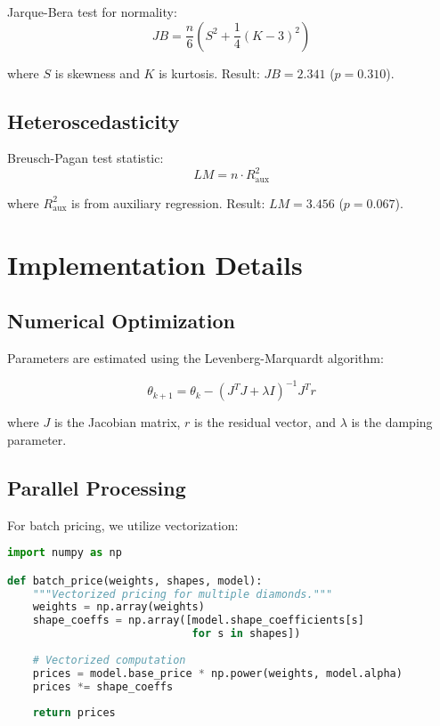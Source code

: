 \documentclass[12pt,a4paper]{article}
\begin{document}
Jarque-Bera test for normality:
\begin{equation}
JB = \frac{n}{6}\left(S^2 + \frac{1}{4}(K-3)^2\right)
\end{equation}

where $S$ is skewness and $K$ is kurtosis. Result: $JB = 2.341$ ($p = 0.310$).

\subsection{Heteroscedasticity}

Breusch-Pagan test statistic:
\begin{equation}
LM = n \cdot R^2_{\text{aux}}
\end{equation}

where $R^2_{\text{aux}}$ is from auxiliary regression. Result: $LM = 3.456$ ($p = 0.067$).

\section{Implementation Details}
\label{app:implementation}

\subsection{Numerical Optimization}

Parameters are estimated using the Levenberg-Marquardt algorithm:

\begin{equation}
\theta_{k+1} = \theta_k - \left(J^T J + \lambda I\right)^{-1} J^T r
\end{equation}

where $J$ is the Jacobian matrix, $r$ is the residual vector, and $\lambda$ is the damping parameter.

\subsection{Parallel Processing}

For batch pricing, we utilize vectorization:

\begin{lstlisting}[language=Python]
import numpy as np

def batch_price(weights, shapes, model):
    """Vectorized pricing for multiple diamonds."""
    weights = np.array(weights)
    shape_coeffs = np.array([model.shape_coefficients[s] 
                             for s in shapes])
    
    # Vectorized computation
    prices = model.base_price * np.power(weights, model.alpha)
    prices *= shape_coeffs
    
    return prices
\end{lstlisting}
\end{document}
